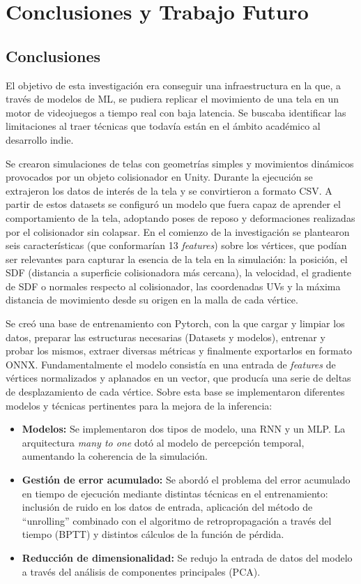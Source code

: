 \chapter{Conclusiones y Trabajo Futuro}
\label{cap:conclusiones}

\section{Conclusiones}
El objetivo de esta investigación era conseguir una infraestructura en la que, a través de modelos de ML, se pudiera replicar el movimiento de una tela en un motor de videojuegos a tiempo real con baja latencia. Se buscaba identificar las limitaciones al traer técnicas que todavía están en el ámbito académico al desarrollo indie. \newline

Se crearon simulaciones de telas con geometrías simples y movimientos dinámicos provocados por un objeto colisionador en Unity. Durante la ejecución se extrajeron los datos de interés de la tela y se convirtieron a formato CSV. A partir de estos datasets se configuró un modelo que fuera capaz de aprender el comportamiento de la tela, adoptando poses de reposo y deformaciones realizadas por el colisionador sin colapsar. En el comienzo de la investigación se plantearon seis características (que conformarían 13 \textit{features}) sobre los vértices, que podían ser relevantes para capturar la esencia de la tela en la simulación: la posición, el SDF (distancia a superficie colisionadora más cercana), la velocidad, el gradiente de SDF o normales respecto al colisionador, las coordenadas UVs y la máxima distancia de movimiento desde su origen en la malla de cada vértice. \newline

Se creó una base de entrenamiento con Pytorch, con la que cargar y limpiar los datos, preparar las estructuras necesarias (Datasets y modelos), entrenar y probar los mismos, extraer diversas métricas y finalmente exportarlos en formato ONNX. Fundamentalmente el modelo consistía en una entrada de \textit{features} de vértices normalizados y aplanados en un vector, que producía una serie de deltas de desplazamiento de cada vértice. Sobre esta base se implementaron diferentes modelos y técnicas pertinentes para la mejora de la inferencia:
\begin{itemize}
    \item \textbf{Modelos:} Se implementaron dos tipos de modelo, una RNN y un MLP. La arquitectura \textit{many to one} dotó al modelo de percepción temporal, aumentando la coherencia de la simulación.
    \item \textbf{Gestión de error acumulado:} Se abordó el problema del error acumulado en tiempo de ejecución mediante distintas técnicas en el entrenamiento: inclusión de ruido en los datos de entrada, aplicación del método de ``unrolling'' combinado con el algoritmo de retropropagación a través del tiempo (BPTT) y distintos cálculos de la función de pérdida.
    \item \textbf{Reducción de dimensionalidad:} Se redujo la entrada de datos del modelo a través del análisis de componentes principales (PCA).
\end{itemize}

